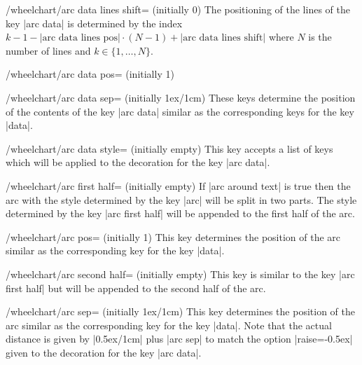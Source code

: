 \documentclass[a4paper,english,dvipsnames]{ltxdoc}
\begin{document}
\begin{key}{/wheelchart/arc data lines shift= (initially 0)}
The positioning of the lines of the key |arc data| is determined by the index $k-1-\text{|arc data lines pos|}\cdot(N-1)+\text{|arc data lines shift|}$ where $N$ is the number of lines and $k\in\{1,\dots,N\}$.
\end{key}
\begin{key}{/wheelchart/arc data pos= (initially 1)}
\end{key}
\begin{key}{/wheelchart/arc data sep= (initially 1ex/1cm)}
These keys determine the position of the contents of the key |arc data| similar as the corresponding keys for the key |data|.
\end{key}
\begin{stylekey}{/wheelchart/arc data style= (initially \normalfont empty)}
This key accepts a list of keys which will be applied to the decoration for the key |arc data|.
\end{stylekey}
\begin{stylekey}{/wheelchart/arc first half= (initially \normalfont empty)}
If |arc around text| is true then the arc with the style determined by the key |arc| will be split in two parts. The style determined by the key |arc first half| will be appended to the first half of the arc.
\end{stylekey}
\begin{key}{/wheelchart/arc pos= (initially 1)}
This key determines the position of the arc similar as the corresponding key for the key |data|.
\end{key}
\begin{stylekey}{/wheelchart/arc second half= (initially \normalfont empty)}
This key is similar to the key |arc first half| but will be appended to the second half of the arc.
\end{stylekey}
\begin{key}{/wheelchart/arc sep= (initially 1ex/1cm)}
This key determines the position of the arc similar as the corresponding key for the key |data|. Note that the actual distance is given by |0.5ex/1cm| plus |arc sep| to match the option |raise=-0.5ex| given to the decoration for the key |arc data|.
\begin{codeexample}[width=10cm,preamble={\usetikzlibrary{decorations.text}}]
\end{codeexample}
\end{key}
\end{document}
